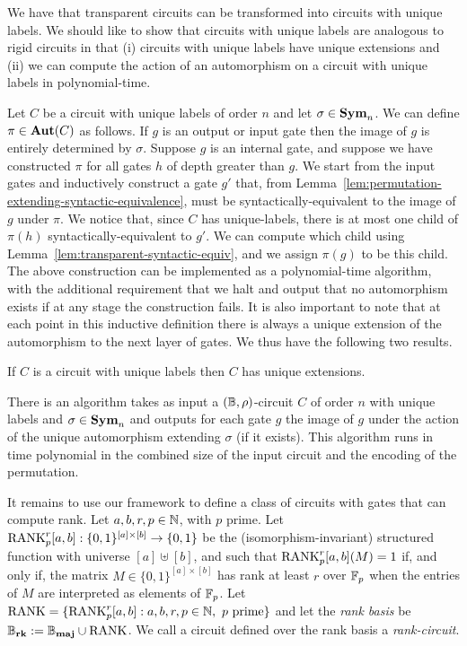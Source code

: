 \documentclass[a4paper,UKenglish]{lipics-v2018}
\begin{document}
We have that transparent circuits can be transformed into circuits with unique
labels. We should like to show that circuits with unique labels are analogous to
rigid circuits in that (i) circuits with unique labels have unique extensions
and (ii) we can compute the action of an automorphism on a circuit with unique
labels in polynomial-time.

Let $C$ be a circuit with unique labels of order $n$ and let $\sigma \in
\text{\textbf{Sym}}_n$. We can define $\pi \in \text{\textbf{Aut}}(C)$ as follows. If $g$ is an output or
input gate then the image of $g$ is entirely determined by $\sigma$. Suppose $g$
is an internal gate, and suppose we have constructed $\pi$ for all gates $h$ of
depth greater than $g$. We start from the input gates and inductively construct
a gate $g'$ that, from
Lemma~\ref{lem:permutation-extending-syntactic-equivalence}, must be
syntactically-equivalent to the image of $g$ under $\pi$. We notice that, since
$C$ has unique-labels, there is at most one child of $ \pi(h)$
syntactically-equivalent to $g'$. We can compute which child using
Lemma~\ref{lem:transparent-syntactic-equiv}, and we assign $\pi(g)$ to be this
child. The above construction can be implemented as a polynomial-time algorithm,
with the additional requirement that we halt and output that no automorphism
exists if at any stage the construction fails. It is also important to note that
at each point in this inductive definition there is always a unique extension of
the automorphism to the next layer of gates. We thus have the following two
results.

\begin{lemma}
  If $C$ is a circuit with unique labels then $C$ has unique extensions.
  \label{lem:unique-labels-unique-extensions}
\end{lemma}

\begin{lemma}
  There is an algorithm takes as input a $(\mathbb{B}, \rho)$-circuit $C$ of order $n$
  with unique labels and $\sigma \in \text{\textbf{Sym}}_n$ and outputs for each gate $g$ the
  image of $g$ under the action of the unique automorphism extending $\sigma$
  (if it exists). This algorithm runs in time polynomial in the combined size of
  the input circuit and the encoding of the permutation.
  \label{lem:compute-automorphisms}
\end{lemma}

It remains to use our framework to define a class of circuits with gates that
can compute rank. Let $a, b, r, p \in \mathbb{N}$, with $p$ prime. Let
$\text{\upshape RANK}^r_p[a,b] : \{0,1\}^{[a] \times [b]} \rightarrow \{0,1\}$ be the
(isomorphism-invariant) structured function with universe $[a] \uplus [b]$, and
such that $\text{\upshape RANK}^r_p[a,b](M) = 1$ if, and only if, the matrix $M \in
\{0,1\}^{[a] \times [b]}$ has rank at least $r$ over $\mathbb{F}_p$ when the entries of
$M$ are interpreted as elements of $\mathbb{F}_p$. Let $\text{\upshape RANK} = \{\text{\upshape RANK}^{r}_p[a,b] : a,
b, r, p \in \mathbb{N}, \text{ $p$ prime}\}$ and let the \emph{rank basis} be $\mathbb{B}_{\text{\textbf{rk}}} :=
\mathbb{B}_{\text{\textbf{maj}}} \cup \text{\upshape RANK}$. We call a circuit defined over the rank basis a
\emph{rank-circuit}.
\end{document}
